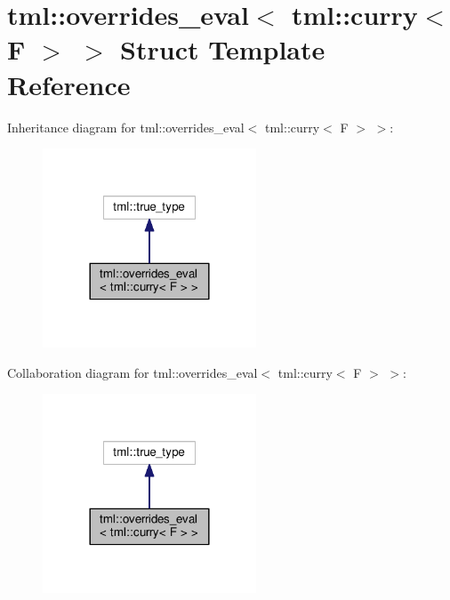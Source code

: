 \hypertarget{structtml_1_1overrides__eval_3_01tml_1_1curry_3_01_f_01_4_01_4}{\section{tml\+:\+:overrides\+\_\+eval$<$ tml\+:\+:curry$<$ F $>$ $>$ Struct Template Reference}
\label{structtml_1_1overrides__eval_3_01tml_1_1curry_3_01_f_01_4_01_4}
}


Inheritance diagram for tml\+:\+:overrides\+\_\+eval$<$ tml\+:\+:curry$<$ F $>$ $>$\+:
\nopagebreak
\begin{figure}[H]
\begin{center}
\leavevmode
\includegraphics[width=180pt]{structtml_1_1overrides__eval_3_01tml_1_1curry_3_01_f_01_4_01_4__inherit__graph}
\end{center}
\end{figure}


Collaboration diagram for tml\+:\+:overrides\+\_\+eval$<$ tml\+:\+:curry$<$ F $>$ $>$\+:
\nopagebreak
\begin{figure}[H]
\begin{center}
\leavevmode
\includegraphics[width=180pt]{structtml_1_1overrides__eval_3_01tml_1_1curry_3_01_f_01_4_01_4__coll__graph}
\end{center}
\end{figure}


